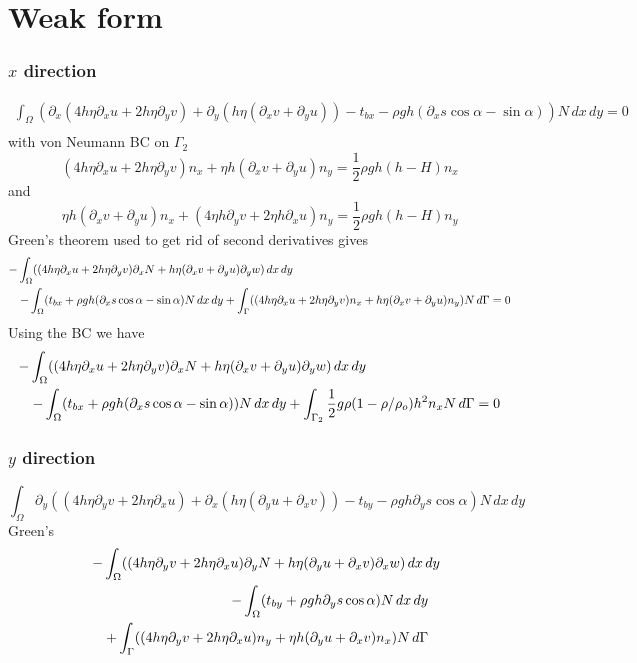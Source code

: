 \documentclass[10pt,a4paper]{book}
\newcommand{\p}{\partial}
\newcommand{\tbx}{t_{bx}}
\newcommand{\tby}{t_{by}}
\begin{document}
\section{Weak form}

\subsubsection{$x$ direction}
\begin{eqnarray} 
\int_{\Omega} (\p_x ( 4 h \eta \p_x u + 2 h \eta \p_y v) +\p_y ( h \eta (\p_x v + \p_y u)) - \tbx-
\rho g h (\p_x s \cos \alpha  -  \sin \alpha )) N \,dx \,dy =0 \nonumber \\ \nonumber
\end{eqnarray}
with von Neumann BC on $\Gamma_2$
\[
( 4 h \eta \p_x u + 2 h \eta \p_y v) n_x + \eta h (\p_x v +\p_y u) n_y =\frac{1}{2} \rho g h (h-H) n_x
\]
and
\[
\eta h (\p_x v + \p_y u) n_x + ( 4 \eta h \p_y v + 2 \eta h \p_x u) n_y =\frac{1}{2} \rho g h (h-H) n_y
\]
Green's theorem used to get rid of second derivatives gives
\begin{eqnarray}
\lefteqn{- \int_{\Omega} ((4 h \eta \p_x u+ 2 h \eta \p_y v) \p_x N + h \eta (\p_x v+\p_y u)  \p_y w) \, dx\, dy } \nonumber \\
& & -\int_{\Omega} ( \tbx + \rho g h (\p_x s \cos \alpha - \sin \alpha) N \, dx \, dy
+\int_{\Gamma} ((4 h \eta \p_x u + 2 h \eta \p_y v) n_x + h \eta (\p_x v +\p_y u) n_y ) N \, d\Gamma
=0 \nonumber
\end{eqnarray}
Using the BC we have
\begin{eqnarray}
\lefteqn{- \int_{\Omega} ((4 h \eta \p_x u+ 2 h \eta \p_y v) \p_x N + h \eta (\p_x v+\p_y u)  \p_y w) \, dx\, dy } \nonumber \\
& & -\int_{\Omega} ( \tbx + \rho g h (\p_x s \cos \alpha - \sin \alpha)) N \, dx \, dy
+\int_{\Gamma_2} \frac{1}{2} g \rho (1-\rho/\rho_o) h^2 n_x  N \, d\Gamma
=0 \nonumber
\end{eqnarray}

\subsubsection{$y$ direction}

\[
\int_{\Omega} \p_y (( 4 h \eta \p_y v + 2 h \eta \p_x u) +\p_x ( h \eta (\p_y u + \p_x v)) - \tby
-\rho g h \p_y s \cos \alpha ) N \, dx \, dy
\]
Green's
\begin{eqnarray}
\lefteqn{-\int_{\Omega} ( (4 h \eta \p_y v + 2 h \eta \p_x u)\p_y N +  h \eta (\p_y u + \p_x v) \p_x w) \, dx \, dy }\nonumber \\
& & - \int_{\Omega}( \tby + \rho g h \p_y s \cos \alpha ) N \, dx \, dy \nonumber \\
& & + \int_{\Gamma} ( (4 h \eta \p_y v + 2 h \eta \p_x u) n_y + \eta h(\p_y u + \p_x v) n_x ) N \, d\Gamma
\end{eqnarray}
\end{document}
